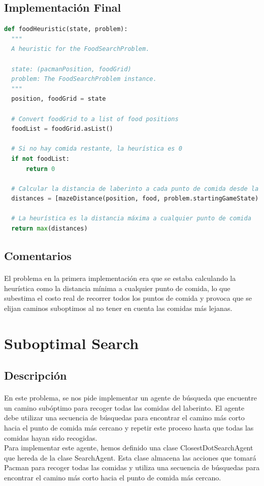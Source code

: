 \documentclass{report}
\begin{document}
        \subsection*{Implementación Final}
          \begin{lstlisting}[language=Python, caption=Implementación final de la heurística del problema de las esquinas]
def foodHeuristic(state, problem):
  """
  A heuristic for the FoodSearchProblem.
  
  state: (pacmanPosition, foodGrid)
  problem: The FoodSearchProblem instance.
  """
  position, foodGrid = state

  # Convert foodGrid to a list of food positions
  foodList = foodGrid.asList()

  # Si no hay comida restante, la heurística es 0
  if not foodList:
      return 0

  # Calcular la distancia de laberinto a cada punto de comida desde la posición actual de Pacman
  distances = [mazeDistance(position, food, problem.startingGameState) for food in foodList]

  # La heurística es la distancia máxima a cualquier punto de comida
  return max(distances)
          \end{lstlisting}
        \subsection*{Comentarios}
          \paragraph*{}{
            El problema en la primera implementación era que se estaba calculando la heurística como la distancia mínima a cualquier punto de comida, lo que subestima el costo real de recorrer todos los puntos de comida y provoca que se elijan caminos suboptimos al no tener en cuenta las comidas más lejanas.\\
          }
      \clearpage\section{Suboptimal Search}
        \subsection*{Descripción}
          \paragraph*{}{
            En este problema, se nos pide implementar un agente de búsqueda que encuentre un camino subóptimo para recoger todas las comidas del laberinto. El agente debe utilizar una secuencia de búsquedas para encontrar el camino más corto hacia el punto de comida más cercano y repetir este proceso hasta que todas las comidas hayan sido recogidas.\\
            Para implementar este agente, hemos definido una clase ClosestDotSearchAgent que hereda de la clase SearchAgent. Esta clase almacena las acciones que tomará Pacman para recoger todas las comidas y utiliza una secuencia de búsquedas para encontrar el camino más corto hacia el punto de comida más cercano.\\
          }
\end{document}
